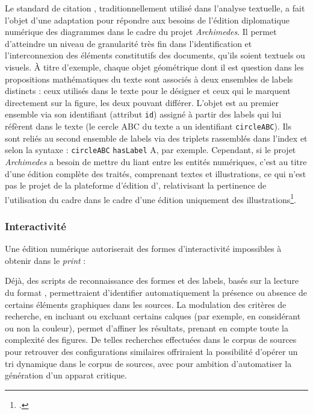 Le standard de citation \CITE, traditionnellement utilisé dans l'analyse
textuelle, a fait l'objet d'une adaptation pour répondre aux besoins de
l'édition diplomatique numérique des diagrammes dans le cadre du projet
\textit{Archimedes}. Il permet d'atteindre un niveau de granularité très fin dans
l'identification et l'interconnexion des éléments constitutifs des
documents, qu'ils soient textuels ou visuels. À titre d'exemple, chaque
objet géométrique dont il est question dans les propositions
mathématiques du texte sont associés à deux ensembles de labels
distincts : ceux utilisés dans le texte pour le désigner et ceux qui le
marquent directement sur la figure, les deux pouvant différer. L'objet
est au premier ensemble via son identifiant (attribut \texttt{id}) assigné à
partir des labels qui lui réfèrent dans le texte (le cercle ABC du
texte a un identifiant \texttt{circleABC}). Ils sont reliés au second
ensemble de labels via des triplets rassemblés dans l'index et selon la
syntaxe : \texttt{circleABC} \texttt{hasLabel} A, par exemple. Cependant, si
le projet \emph{Archimedes} a besoin de mettre du liant entre les
entités numériques, c'est au titre d'une édition complète des traités,
comprenant textes et illustrations, ce qui n'est pas le projet de la
plateforme d'édition d'\eida, relativisant la pertinence de l'utilisation du cadre \CITE dans le cadre
d'une édition uniquement des illustrations\footcite[p.81]{roughan_digital_2014}.

\hypertarget{interactivite}{%
\subsubsection{Interactivité}\label{interactivite}}

Une édition numérique autoriserait des formes d'interactivité
impossibles à obtenir dans le \textit{print} :

Déjà, des scripts de reconnaissance des formes et des
labels, basés sur la lecture du format \svg, permettraient d'identifier
automatiquement la présence ou absence de certains éléments graphiques
dans les sources. La modulation des critères de recherche, en incluant
ou excluant certains calques (par exemple, en considérant ou non la
couleur), permet d'affiner les résultats, prenant en compte toute la
complexité des figures. De telles recherches effectuées dans le corpus de
sources pour retrouver des configurations similaires offriraient la
possibilité d'opérer un tri dynamique dans le corpus de sources, avec
pour ambition d'automatiser la génération d'un apparat critique.

